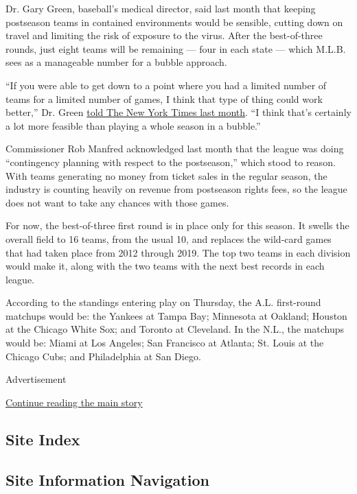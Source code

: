 Dr. Gary Green, baseball's medical director, said last month that
keeping postseason teams in contained environments would be sensible,
cutting down on travel and limiting the risk of exposure to the virus.
After the best-of-three rounds, just eight teams will be remaining ---
four in each state --- which M.L.B. sees as a manageable number for a
bubble approach.

``If you were able to get down to a point where you had a limited number
of teams for a limited number of games, I think that type of thing could
work better,'' Dr. Green
\href{https://www.nytimes3xbfgragh.onion/2020/08/10/sports/baseball/rob-manfred-mlb-season-outbreaks.html}{told
The New York Times last month}. ``I think that's certainly a lot more
feasible than playing a whole season in a bubble.''

Commissioner Rob Manfred acknowledged last month that the league was
doing ``contingency planning with respect to the postseason,'' which
stood to reason. With teams generating no money from ticket sales in the
regular season, the industry is counting heavily on revenue from
postseason rights fees, so the league does not want to take any chances
with those games.

For now, the best-of-three first round is in place only for this season.
It swells the overall field to 16 teams, from the usual 10, and replaces
the wild-card games that had taken place from 2012 through 2019. The top
two teams in each division would make it, along with the two teams with
the next best records in each league.

According to the standings entering play on Thursday, the A.L.
first-round matchups would be: the Yankees at Tampa Bay; Minnesota at
Oakland; Houston at the Chicago White Sox; and Toronto at Cleveland. In
the N.L., the matchups would be: Miami at Los Angeles; San Francisco at
Atlanta; St. Louis at the Chicago Cubs; and Philadelphia at San Diego.

Advertisement

\protect\hyperlink{after-bottom}{Continue reading the main story}

\hypertarget{site-index}{%
\subsection{Site Index}\label{site-index}}

\hypertarget{site-information-navigation}{%
\subsection{Site Information
Navigation}\label{site-information-navigation}}

